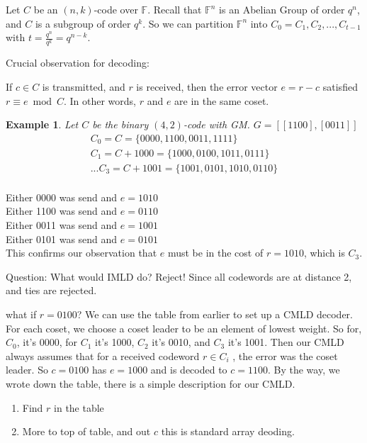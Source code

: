 \documentclass{article}
\newtheorem{eg}{Example}
\begin{document}
Let $C$ be an $(n, k)$-code over $\mathbb{F}$. Recall that $\mathbb{F}^n$
is an Abelian Group of order $q^n$, and $C$ is a subgroup of order $q^k$.
So we can partition $\mathbb{F}^n$ into $C_0 = C_1, C_2, ..., C_{t-1}$ with
$t = \frac{q^n}{q^k} = q^{n-k}$.

Crucial observation for decoding:

If $c\in C$ is transmitted, and $r$ is received, then the error vector
$e = r-c$ satisfied $r\equiv e\bmod{C}$. In other words, $r$ and $e$ are
in the same coset.

\begin{eg}
    Let $C$ be the binary $(4,2)$-code with GM. $G = [[ 1 1 0 0 ], [ 0 0 1 1 ]]$
    \begin{align*}
        C_0 = C = \{0000, 1100, 0011, 1111\}\\
        C_1 = C + 1000 = \{1000, 0100, 1011, 0111\}\\
        ...
        C_3 = C + 1001 = \{1001, 0101, 1010, 0110\}\\
    \end{align*}
\end{eg}

Either 0000 was send and $e = 1010$\\
Either 1100 was send and $e = 0110$\\
Either 0011 was send and $e = 1001$\\
Either 0101 was send and $e = 0101$\\

This confirms our observation that $e$ must be in the cost of $r = 1010$, which is
$C_3$.

Question: What would IMLD do? Reject! Since all codewords are at distance 2, and
ties are rejected.

what if $r = 0100$? We can use the table from earlier to set up a CMLD decoder.
For each coset, we choose a coset leader to be an element of lowest weight. So
for, $C_0$, it's 0000, for $C_1$ it's 1000, $C_2$ it's 0010, and $C_3$ it's
1001. Then our CMLD always assumes that for a received codeword $r\in C_i$ , the
error was the coset leader. So $c=0100$ has $e=1000$ and is decoded to $c=1100$.
By the way, we wrote down the table, there is a simple description for our CMLD.
\begin{enumerate}
    \item Find $r$ in the table
    \item More to top of table, and out $c$ this is standard array deoding.
\end{enumerate}
\end{document}
